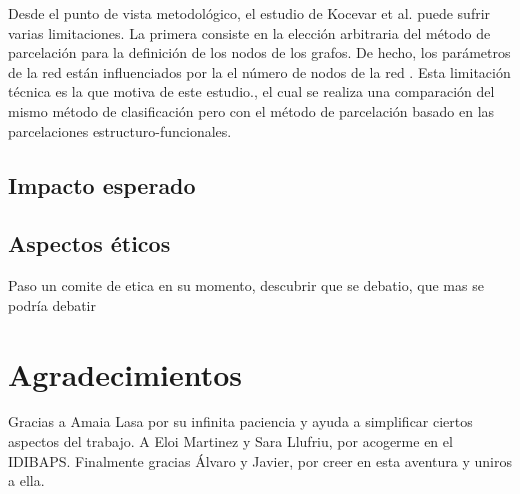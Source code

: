 \documentclass[fleqn,12pt]{UICArticle} %
\begin{document}
Desde el punto de vista metodológico, el estudio de Kocevar et al. \cite{Kocevar2016} puede sufrir varias limitaciones. La primera consiste en la elección arbitraria del método de parcelación para la definición de los nodos de los grafos. De hecho, los parámetros de la red están influenciados por la el número de nodos de la red \cite{Zalesky2010}. Esta limitación técnica es la que motiva  de este estudio., el cual se realiza una comparación del mismo método de clasificación pero con el método de parcelación basado en las parcelaciones estructuro-funcionales.


\subsection{Impacto esperado}

\subsection{Aspectos éticos}
Paso un comite de etica en su momento, descubrir que se debatio, que mas se podría debatir


\section*{Agradecimientos}
Gracias a Amaia Lasa por su infinita paciencia y ayuda a simplificar ciertos aspectos del trabajo. A Eloi Martinez y Sara Llufriu, por acogerme en el IDIBAPS. Finalmente gracias Álvaro y Javier, por creer en esta aventura y uniros a ella.

\endgroup






\end{document}
